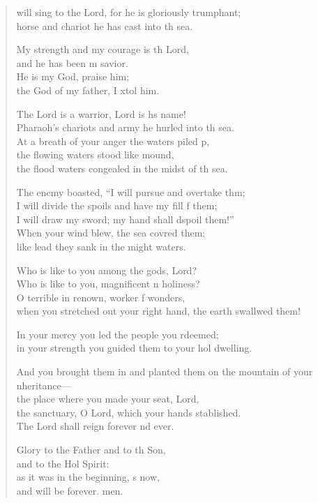 \begin{verse}
  \begin{patverse}
     will sing to the Lord, for he is gloriously tr\pointup{\i}umphant;\Med\\
horse and chariot he has cast into th sea.

My strength and my courage is th Lord,\Med\\
and he has been m savior.\\
He is my God,  praise him;\Med\\
the God of my father, I xtol him.

The Lord is a warrior, Lord is h\pointup{\i}s name!\Med\\
Pharaoh’s chariots and army he hurled into th sea.\\
At a breath of your anger the waters piled p,\Flex\\
the flowing waters stood like  mound,\Med\\
the flood waters congealed in the midst of th sea.

The enemy boasted, “I will pursue and overtake thm;\Flex\\
I will divide the spoils and have my fill f them;\Med\\
I will draw my sword; my hand shall dspoil them!”\\
When your wind blew, the sea covred them;\Med\\
like lead they sank in the might waters.

Who is like to you among the gods,  Lord?\Med\\
Who is like to you, magnificent \pointup{\i}n holiness?\\
O terrible in renown, worker f wonders,\Med\\
when you stretched out your right hand, the earth swallwed them!

In your mercy you led the people you rdeemed;\Med\\
in your strength you guided them to your hol dwelling.

And you brought them in and planted them on the mountain of your \pointup{\i}nheritance—\Med\\
the place where you made your seat,  Lord,\\
the sanctuary, O Lord, which your hands stablished.\Med\\
The Lord shall reign forever nd ever.

Glory to the Father and to th Son,\Med\\
and to the Hol Spirit:\\
as it was in the beginning, \pointup{\i}s now,\Med\\
and will be forever. men. 
  \end{patverse}
\end{verse}
